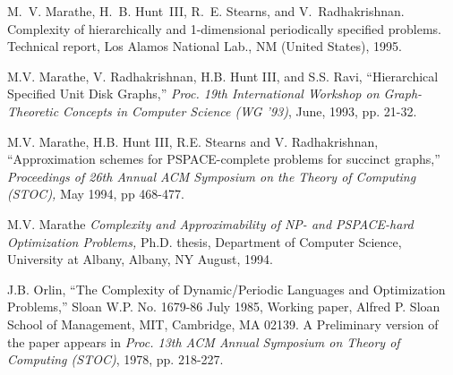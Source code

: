 \begin{thebibliography}{HMRR93}
M.~V. Marathe, H.~B. Hunt~III, R.~E. Stearns, and V.~Radhakrishnan.
\newblock Complexity of hierarchically and 1-dimensional periodically specified
  problems.
\newblock Technical report, Los Alamos National Lab., NM (United States), 1995.


M.V. Marathe, V. Radhakrishnan,  H.B. Hunt III,  and S.S. Ravi,
``Hierarchical Specified Unit Disk Graphs,''
{\em Proc. 19th International 
Workshop on Graph-Theoretic Concepts in Computer Science (WG '93)}, 
June, 1993, pp. 21-32. 




  M.V. Marathe, H.B. Hunt III, 
R.E. Stearns and V. Radhakrishnan,
``Approximation schemes for
{PSPACE}-complete problems for succinct graphs,'' 
{\em Proceedings of 26th Annual ACM
Symposium on the Theory of Computing (STOC),} May 1994,
pp 468-477.




 M.V. Marathe
{\em Complexity and Approximability of {NP}- and {PSPACE}-hard Optimization
Problems,}
Ph.D. thesis, Department of Computer Science, 
University at Albany,  Albany, NY August, 1994.


\iffalse
\bibitem[MH+95a]{MH+95a} M.V. Marathe, H.B. Hunt III and R.E. Stearns 
``Time as  Second Dimension: Complexity of Periodically Specified Problems,''
manuscript under preparation,
February, 1995.





\bibitem[MTM92]{MTM92} J.O. McClain, L.J. Thomas and J.B. Mazzola,
{\em Operations Management,}
Prentice Hall, Englewood Cliffs, 1992.

\bibitem[MC80]{MC80} C. Mead and L. Conway,
{\em Introduction to VLSI systems}
Addison Wesley, 1980.




\bibitem[MS81]{MS81} B.Monien and I.H.Sudborough, 
``Bounding the Bandwidth of {NP}-Complete Problems,''
{\em Proc. 13th ACM Annual Symposium on Theory of Computing (STOC)},
1981, pp. 279-292.
\fi






 J.B. Orlin,
``The Complexity of Dynamic/Periodic Languages and Optimization Problems,''
Sloan W.P. No. 1679-86 July 1985,
Working paper, Alfred P. Sloan School of Management,
MIT, Cambridge, MA 02139. A Preliminary version of the paper appears in
{\em Proc. 13th ACM Annual Symposium on Theory of Computing (STOC)}, 
1978, pp. 218-227.





\end{thebibliography}
